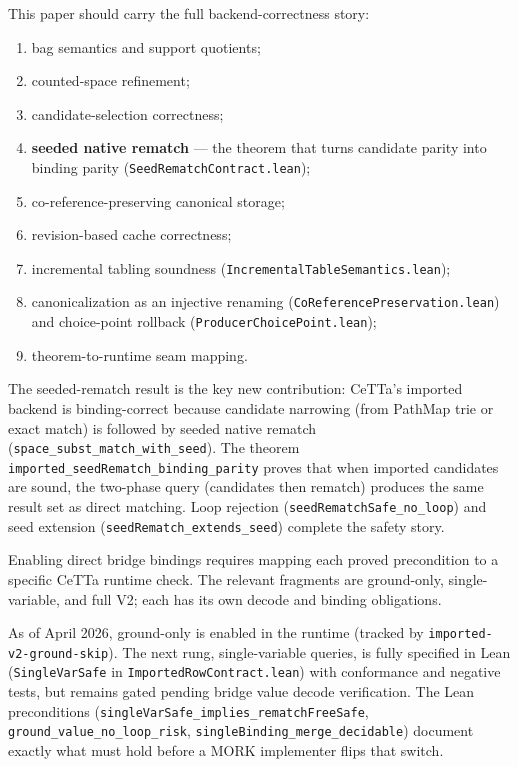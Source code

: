 \documentclass[11pt]{article}
\newcommand{\code}[1]{\texttt{#1}}
\begin{document}
This paper should carry the full backend-correctness story:
\begin{enumerate}
\item bag semantics and support quotients;
\item counted-space refinement;
\item candidate-selection correctness;
\item \textbf{seeded native rematch} --- the theorem that turns candidate parity into binding parity (\code{SeedRematchContract.lean});
\item co-reference-preserving canonical storage;
\item revision-based cache correctness;
\item incremental tabling soundness (\code{IncrementalTableSemantics.lean});
\item canonicalization as an injective renaming (\code{CoReferencePreservation.lean}) and choice-point rollback (\code{ProducerChoicePoint.lean});
\item theorem-to-runtime seam mapping.
\end{enumerate}

The seeded-rematch result is the key new contribution: CeTTa's imported backend is binding-correct because candidate narrowing (from PathMap trie or exact match) is followed by seeded native rematch (\code{space\_subst\_match\_with\_seed}).  The theorem \code{imported\_seedRematch\_binding\_parity} proves that when imported candidates are sound, the two-phase query (candidates then rematch) produces the same result set as direct matching.  Loop rejection (\code{seedRematchSafe\_no\_loop}) and seed extension (\code{seedRematch\_extends\_seed}) complete the safety story.

Enabling direct bridge bindings requires mapping each proved precondition to
a specific CeTTa runtime check. The relevant fragments are ground-only,
single-variable, and full V2; each has its own decode and binding obligations.

As of April 2026, ground-only is enabled in the runtime (tracked by
\code{imported-v2-ground-skip}).  The next rung, single-variable queries,
is fully specified in Lean (\code{SingleVarSafe} in \code{ImportedRowContract.lean})
with conformance and negative tests, but remains gated pending bridge value
decode verification.  The Lean preconditions
(\code{singleVarSafe\_implies\_rematchFreeSafe}, \code{ground\_value\_no\_loop\_risk},
\code{singleBinding\_merge\_decidable}) document exactly what must hold before
a MORK implementer flips that switch.
\end{document}
